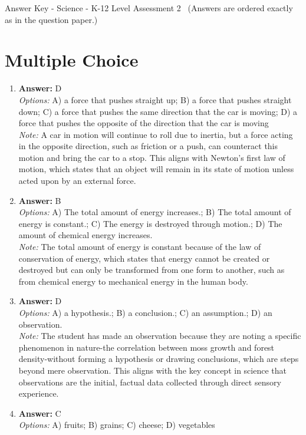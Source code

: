 \documentclass[12pt]{article}
\begin{document}
\begin{center}
Answer Key - Science - K-12 Level Assessment 2 \
\small (Answers are ordered exactly as in the question paper.)
\end{center}

\section*{Multiple Choice}
\begin{enumerate}[label=\arabic*.]
\item \textbf{Answer:} D
\\ \textit{Options:} A) a force that pushes straight up; B) a force that pushes straight down; C) a force that pushes the same direction that the car is moving; D) a force that pushes the opposite of the direction that the car is moving
\\ \textit{Note:} A car in motion will continue to roll due to inertia, but a force acting in the opposite direction, such as friction or a push, can counteract this motion and bring the car to a stop. This aligns with Newton's first law of motion, which states that an object will remain in its state of motion unless acted upon by an external force.
\item \textbf{Answer:} B
\\ \textit{Options:} A) The total amount of energy increases.; B) The total amount of energy is constant.; C) The energy is destroyed through motion.; D) The amount of chemical energy increases.
\\ \textit{Note:} The total amount of energy is constant because of the law of conservation of energy, which states that energy cannot be created or destroyed but can only be transformed from one form to another, such as from chemical energy to mechanical energy in the human body.
\item \textbf{Answer:} D
\\ \textit{Options:} A) a hypothesis.; B) a conclusion.; C) an assumption.; D) an observation.
\\ \textit{Note:} The student has made an observation because they are noting a specific phenomenon in nature-the correlation between moss growth and forest density-without forming a hypothesis or drawing conclusions, which are steps beyond mere observation. This aligns with the key concept in science that observations are the initial, factual data collected through direct sensory experience.
\item \textbf{Answer:} C
\\ \textit{Options:} A) fruits; B) grains; C) cheese; D) vegetables

\end{enumerate}
\end{document}
